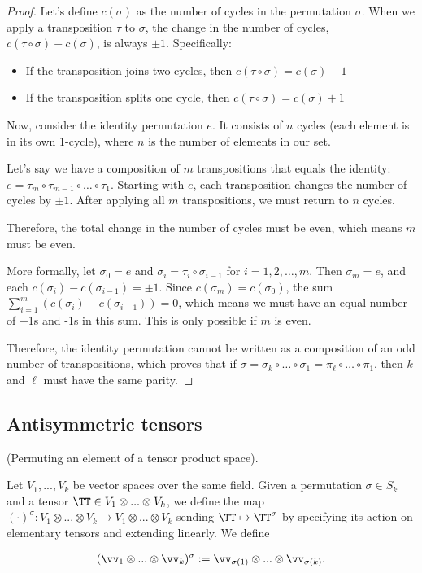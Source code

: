 \begin{proof}
    
    
    Let's define $c(\sigma)$ as the number of cycles in the permutation $\sigma$. When we apply a transposition $\tau$ to $\sigma$, the change in the number of cycles, $c(\tau \circ \sigma) - c(\sigma)$, is always $\pm1$. Specifically:
    \begin{itemize}
        \item If the transposition joins two cycles, then $c(\tau \circ \sigma) = c(\sigma) - 1$
        \item If the transposition splits one cycle, then $c(\tau \circ \sigma) = c(\sigma) + 1$
    
    \end{itemize}
    Now, consider the identity permutation $e$. It consists of $n$ cycles (each element is in its own 1-cycle), where $n$ is the number of elements in our set.
    
    Let's say we have a composition of $m$ transpositions that equals the identity: $e = \tau_m \circ \tau_{m-1} \circ \ldots \circ \tau_1$. Starting with $e$, each transposition changes the number of cycles by $±1$. After applying all $m$ transpositions, we must return to $n$ cycles.
    
    Therefore, the total change in the number of cycles must be even, which means $m$ must be even.
    
    More formally, let $\sigma_0 = e$ and $\sigma_i = \tau_i \circ \sigma_{i-1}$ for $i = 1, 2, \ldots, m$. Then $\sigma_m = e$, and each $c(\sigma_i) - c(\sigma_{i-1}) = ±1$. Since $c(\sigma_m) = c(\sigma_0)$, the sum $\sum_{i=1}^{m} (c(\sigma_i) - c(\sigma_{i-1})) = 0$, which means we must have an equal number of +1s and -1s in this sum. This is only possible if $m$ is even.
    
    Therefore, the identity permutation cannot be written as a composition of an odd number of transpositions, which proves that if $\sigma = \sigma_k \circ \ldots \circ \sigma_1 = \pi_\ell \circ \ldots \circ \pi_1$, then $k$ and $\ell$ must have the same parity.
\end{proof}

\subsection*{Antisymmetric tensors}

\begin{defn}
    (Permuting an element of a tensor product space).
    
    Let $V_1, ..., V_k$ be vector spaces over the same field. Given a permutation $\sigma \in S_k$ and a tensor $\TT \in V_1 \otimes ... \otimes V_k$, we define the map $(\cdot)^\sigma:V_1 \otimes ... \otimes V_k \rightarrow V_1 \otimes ... \otimes V_k$ sending $\TT \mapsto \TT^\sigma$ by specifying its action on elementary tensors and extending linearly. We define
    
    \begin{align*}
        (\vv_1 \otimes ... \otimes \vv_k)^\sigma := \vv_{\sigma(1)} \otimes ... \otimes \vv_{\sigma(k)}.
    \end{align*}
\end{defn}

